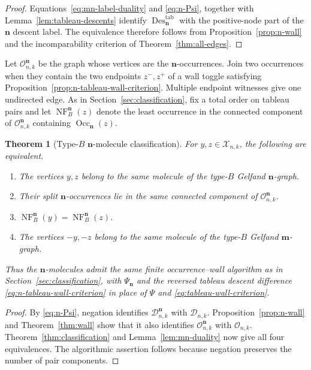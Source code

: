 \documentclass[11pt]{article}
\newtheorem{theorem}{Theorem}[section]
\theoremstyle{definition}
\theoremstyle{remark}
\newcommand{\Des}{\operatorname{Des}}
\newcommand{\Occ}{\operatorname{Occ}}
\newcommand{\NF}{\operatorname{NF}}
\newcommand{\cD}{\mathcal D}
\newcommand{\cO}{\mathcal O}
\newcommand{\cX}{\mathcal X}
\newcommand{\mgraph}{\mathbf m}
\newcommand{\ngraph}{\mathbf n}
\begin{document}
\begin{proof}
Equations~\eqref{eq:mn-label-duality} and \eqref{eq:n-Psi}, together with
Lemma~\ref{lem:tableau-descents} identify
$\Des_{\ngraph}^{\mathrm{tab}}$ with the positive-node part of the
$\ngraph$ descent label.
The equivalence therefore follows from Proposition~\ref{prop:n-wall} and
the incomparability criterion of Theorem~\ref{thm:all-edges}.
\end{proof}

Let $\cO^{\ngraph}_{n,k}$ be the graph whose vertices are the
$\ngraph$-occurrences.  Join two occurrences when they contain the two
endpoints $z^-,z^+$ of a wall toggle satisfying
Proposition~\ref{prop:n-tableau-wall-criterion}.  Multiple endpoint
witnesses give one undirected edge.  As in Section~\ref{sec:classification}, fix a total
order on tableau pairs and let $\NF_B^{\ngraph}(z)$ denote the least
occurrence in the connected component of $\cO^{\ngraph}_{n,k}$ containing
$\Occ_{\ngraph}(z)$.

\begin{theorem}[Type-$B$ $\ngraph$-molecule classification]
\label{thm:n-classification}
For $y,z\in\cX_{n,k}$, the following are equivalent.
\begin{enumerate}[label=\textup{(\roman*)}]
\item The vertices $y,z$ belong to the same molecule of the type-$B$
Gelfand $\ngraph$-graph.
\item Their split $\ngraph$-occurrences lie in the same connected
component of $\cO^{\ngraph}_{n,k}$.
\item $\NF_B^{\ngraph}(y)=\NF_B^{\ngraph}(z)$.
\item The vertices $-y,-z$ belong to the same molecule of the type-$B$
Gelfand $\mgraph$-graph.
\end{enumerate}
Thus the $\ngraph$-molecules admit the same finite occurrence--wall
algorithm as in Section~\ref{sec:classification}, with
$\Psi_{\ngraph}$ and the reversed tableau descent difference
\eqref{eq:n-tableau-wall-criterion} in place of $\Psi$ and
\eqref{eq:tableau-wall-criterion}.
\end{theorem}

\begin{proof}
By \eqref{eq:n-Psi}, negation identifies
$\cD^{\ngraph}_{n,k}$ with $\cD_{n,k}$.  Proposition~\ref{prop:n-wall}
and Theorem~\ref{thm:wall} show that it also identifies
$\cO^{\ngraph}_{n,k}$ with $\cO_{n,k}$.  Theorem~\ref{thm:classification}
and Lemma~\ref{lem:mn-duality} now give all four equivalences.  The
algorithmic assertion follows because negation preserves the number of
pair components.
\end{proof}
\end{document}
